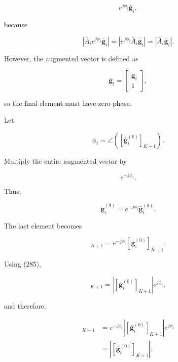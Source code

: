 \documentclass[12pt,a4paper]{article}
\begin{document}
\begin{equation}
e^{j\phi_i}\bar{\mathbf g}_i,
\tag{282}
\end{equation}

because

\begin{equation}
\left|
\bar A_i
e^{j\phi_i}
\bar{\mathbf g}_i
\right|
=
\left|
e^{j\phi_i}
\bar A_i
\bar{\mathbf g}_i
\right|
=
\left|
\bar A_i\bar{\mathbf g}_i
\right|.
\tag{283}
\end{equation}

However, the augmented vector is defined as

\begin{equation}
\bar{\mathbf g}_i
=
\begin{bmatrix}
\mathbf g_i\\
1
\end{bmatrix},
\tag{284}
\end{equation}

so the final element must have zero phase.

Let

\begin{equation}
\boxed{
\phi_i
=
\angle
\left(
[\bar{\mathbf g}_i^{(0)}]_{K+1}
\right)
}.
\tag{285}
\end{equation}

Multiply the entire augmented vector by

\begin{equation}
e^{-j\phi_i}.
\tag{286}
\end{equation}

Thus,

\begin{equation}
\boxed{
\widetilde{\mathbf g}_i^{(0)}
=
e^{-j\phi_i}
\bar{\mathbf g}_i^{(0)}
}.
\tag{287}
\end{equation}

The last element becomes

\begin{equation}
[\widetilde{\mathbf g}_i^{(0)}]_{K+1}
=
e^{-j\phi_i}
[\bar{\mathbf g}_i^{(0)}]_{K+1}.
\tag{288}
\end{equation}

Using (285),

\begin{equation}
[\bar{\mathbf g}_i^{(0)}]_{K+1}
=
\left|
[\bar{\mathbf g}_i^{(0)}]_{K+1}
\right|
e^{j\phi_i},
\tag{289}
\end{equation}

and therefore,

\begin{align}
[\widetilde{\mathbf g}_i^{(0)}]_{K+1}
&=
e^{-j\phi_i}
\left|
[\bar{\mathbf g}_i^{(0)}]_{K+1}
\right|
e^{j\phi_i}
\nonumber\\
&=
\left|
[\bar{\mathbf g}_i^{(0)}]_{K+1}
\right|.
\tag{290}
\end{align}
\end{document}
